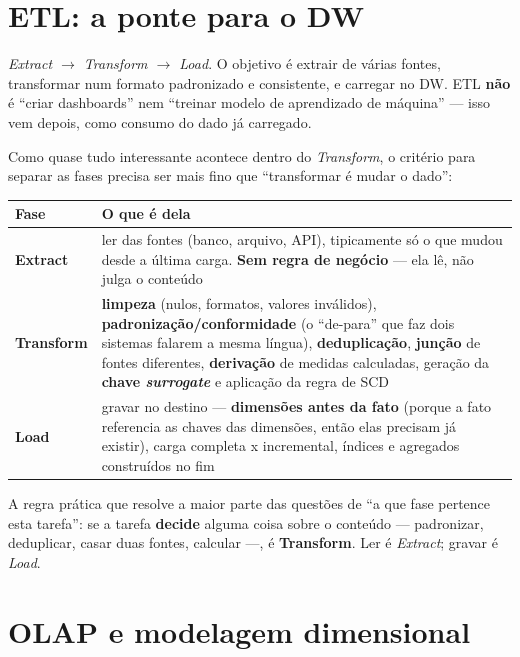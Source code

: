 \section{ETL: a ponte para o DW}

\begin{conceito}
\textit{Extract $\to$ Transform $\to$ Load}. O objetivo é extrair de
várias fontes, transformar num formato padronizado e consistente, e
carregar no DW. ETL \textbf{não} é “criar dashboards” nem “treinar modelo
de aprendizado de máquina” --- isso vem depois, como consumo do dado já
carregado.

Como quase tudo interessante acontece dentro do \textit{Transform}, o
critério para separar as fases precisa ser mais fino que “transformar é
mudar o dado”:

\begin{center}
\begin{tabular}{@{}p{2.1cm}p{9.6cm}@{}}
\toprule
\textbf{Fase} & \textbf{O que é dela} \\
\midrule
\textbf{Extract} & ler das fontes (banco, arquivo, API), tipicamente só o
que mudou desde a última carga. \textbf{Sem regra de negócio} --- ela lê,
não julga o conteúdo \\
\textbf{Transform} & \textbf{limpeza} (nulos, formatos, valores
inválidos), \textbf{padronização/conformidade} (o “de-para” que faz dois
sistemas falarem a mesma língua), \textbf{deduplicação}, \textbf{junção}
de fontes diferentes, \textbf{derivação} de medidas calculadas, geração da
\textbf{chave \textit{surrogate}} e aplicação da regra de SCD \\
\textbf{Load} & gravar no destino --- \textbf{dimensões antes da fato}
(porque a fato referencia as chaves das dimensões, então elas precisam já
existir), carga completa x incremental, índices e agregados construídos
no fim \\
\bottomrule
\end{tabular}
\end{center}

A regra prática que resolve a maior parte das questões de “a que fase
pertence esta tarefa”: se a tarefa \textbf{decide} alguma coisa sobre o
conteúdo --- padronizar, deduplicar, casar duas fontes, calcular ---, é
\textbf{Transform}. Ler é \textit{Extract}; gravar é \textit{Load}.
\end{conceito}

\section{OLAP e modelagem dimensional}

